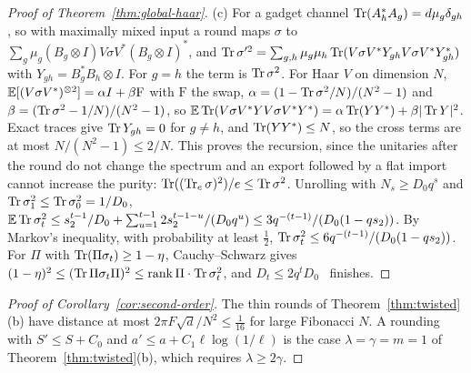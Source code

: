 \begin{proof}[Proof of Theorem~\ref{thm:global-haar}]
(c) For a gadget channel $\operatorname{Tr}(A_h^*A_g)=d\mu_g\delta_{gh}$, so with maximally mixed input a round maps $\sigma$ to $\sum_g\mu_g(B_g\otimes I)V\sigma V^*(B_g\otimes I)^*$, and
$\operatorname{Tr}\sigma'^2=\sum_{g,h}\mu_g\mu_h\operatorname{Tr}(V\sigma V^*Y_{gh}V\sigma V^*Y_{gh}^*)$ with $Y_{gh}=B_g^*B_h\otimes I$. For $g=h$ the term is $\operatorname{Tr}\sigma^2$. For Haar $V$ on dimension $N$,
$\mathbb E[(V\sigma V^*)^{\otimes2}]=\alpha I+\beta\mathrm F$ with $\mathrm F$ the swap, $\alpha=(1-\operatorname{Tr}\sigma^2/N)/(N^2-1)$ and $\beta=(\operatorname{Tr}\sigma^2-1/N)/(N^2-1)$, so
$\mathbb E\operatorname{Tr}(V\sigma V^*YV\sigma V^*Y^*)=\alpha\operatorname{Tr}(YY^*)+\beta|\operatorname{Tr} Y|^2$. Exact traces give $\operatorname{Tr} Y_{gh}=0$ for $g\ne h$, and $\operatorname{Tr}(YY^*)\le N$, so the cross terms are at most
$N/(N^2-1)\le2/N$. This proves the recursion, since the unitaries after the round do not change the spectrum and an export followed by a flat import cannot increase the
purity: $\operatorname{Tr}((\operatorname{Tr}_e\sigma)^2)/e\le\operatorname{Tr}\sigma^2$. Unrolling with $N_s\ge D_0q^s$ and $\operatorname{Tr}\sigma_1^2\le\operatorname{Tr}\sigma_0^2=1/D_0$,
$\mathbb E\operatorname{Tr}\sigma_t^2\le s_2^{t-1}/D_0+\sum_{u=1}^{t-1}2s_2^{t-1-u}/(D_0q^u)\le3q^{-(t-1)}/(D_0(1-qs_2))$. By Markov's inequality, with probability at least $\frac12$,
$\operatorname{Tr}\sigma_t^2\le6q^{-(t-1)}/(D_0(1-qs_2))$. For $\Pi$ with $\operatorname{Tr}(\Pi\sigma_t)\ge1-\eta$, Cauchy--Schwarz gives $(1-\eta)^2\le(\operatorname{Tr}\Pi\sigma_t\Pi)^2\le\operatorname{rank}\Pi\cdot\operatorname{Tr}\sigma_t^2$, and
$D_t\le2q^tD_0$~\cite[proof of Theorem~12.2]{DouglasMghirbiC} finishes.
\end{proof}

\begin{proof}[Proof of Corollary~\ref{cor:second-order}]
The thin rounds of Theorem~\ref{thm:twisted}(b) have distance at most $2\pi F\sqrt d/N^2\le\frac1{16}$ for large Fibonacci $N$. A rounding with $S'\le S+C_0$ and
$a'\le a+C_1\ell\log(1/\ell)$ is the case $\lambda=\gamma=m=1$ of Theorem~\ref{thm:twisted}(b), which requires $\lambda\ge2\gamma$.
\end{proof}

